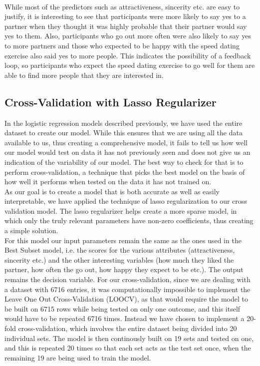 \documentclass{article}
\begin{document}
\null\\
While most of the predictors such as attractiveness, sincerity etc. are easy to justify, it is interesting to see that participants were more likely to say yes to a partner when they thought it was highly probable that their partner would say yes to them. Also, participants who go out more often were also likely to say yes to more partners and those who expected to be happy with the speed dating exercise also said yes to more people. This indicates the possibility of a feedback loop, so participants who expect the speed dating exercise to go well for them are able to find more people that they are interested in.
%
\subsection{Cross-Validation with Lasso Regularizer}
In the logistic regression models described previously, we have used the entire dataset to create our model. While this ensures that we are using all the data available to us, thus creating a comprehensive model, it fails to tell us how well our model would test on data it has not previously seen and does not give us an indication of the variability of our model. The best way to check for that is to perform cross-validation, a technique that picks the best model on the basis of how well it performs when tested on the data it has not trained on. 
\null\\
As our goal is to create a model that is both accurate as well as easily interpretable, we have applied the technique of lasso regularization to our cross validation model. The lasso regularizer helps create a more sparse model, in which only the truly relevant parameters have non-zero coefficients, thus creating a simple solution.
\null\\
For this model our input parameters remain the same as the ones used in the Best Subset model, i.e. the scores for the various attributes (attractiveness, sincerity etc.) and the other interesting variables (how much they liked the partner, how often the go out, how happy they expect to be etc.). The output remains the decision variable. For our cross-validation, since we are dealing with a dataset with 6716 entries, it was computationally impossible to implement the Leave One Out Cross-Validation (LOOCV), as that would require the model to be built on 6715 rows while being tested on only one outcome, and this itself would have to be repeated 6716 times. Instead we have chosen to implement a 20-fold cross-validation, which involves the entire dataset being divided into 20 individual sets. The model is then continously built on 19 sets and tested on one, and this is repeated 20 times so that each set acts as the test set once, when the remaining 19 are being used to train the model.
\end{document}
